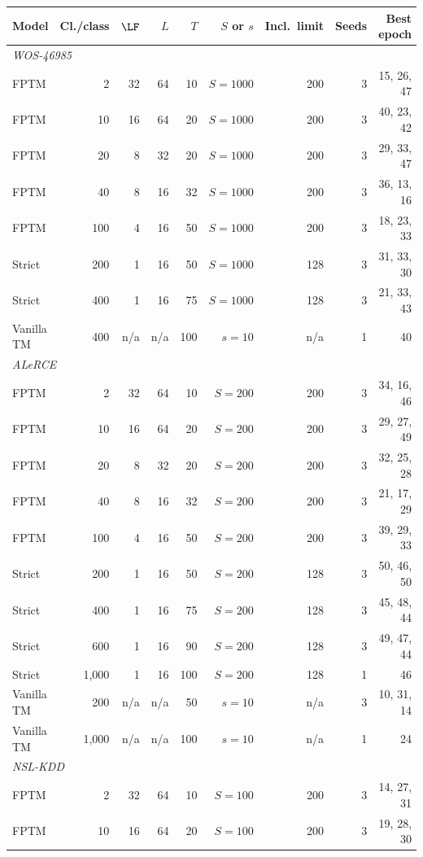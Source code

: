 \begin{tabular}{lrrrrrrrr}
\toprule
Model & Cl./class & $\LF$ & $L$ & $T$ & $S$ or $s$ & Incl.\ limit & Seeds & Best epoch \\
\midrule
\multicolumn{9}{l}{\textit{WOS-46985}} \\
FPTM & 2 & 32 & 64 & 10 & $S=1000$ & 200 & 3 & 15, 26, 47 \\
FPTM & 10 & 16 & 64 & 20 & $S=1000$ & 200 & 3 & 40, 23, 42 \\
FPTM & 20 & 8 & 32 & 20 & $S=1000$ & 200 & 3 & 29, 33, 47 \\
FPTM & 40 & 8 & 16 & 32 & $S=1000$ & 200 & 3 & 36, 13, 16 \\
FPTM & 100 & 4 & 16 & 50 & $S=1000$ & 200 & 3 & 18, 23, 33 \\
Strict & 200 & 1 & 16 & 50 & $S=1000$ & 128 & 3 & 31, 33, 30 \\
Strict & 400 & 1 & 16 & 75 & $S=1000$ & 128 & 3 & 21, 33, 43 \\
Vanilla TM & 400 & n/a & n/a & 100 & $s=10$ & n/a & 1 & 40 \\
\midrule
\multicolumn{9}{l}{\textit{ALeRCE}} \\
FPTM & 2 & 32 & 64 & 10 & $S=200$ & 200 & 3 & 34, 16, 46 \\
FPTM & 10 & 16 & 64 & 20 & $S=200$ & 200 & 3 & 29, 27, 49 \\
FPTM & 20 & 8 & 32 & 20 & $S=200$ & 200 & 3 & 32, 25, 28 \\
FPTM & 40 & 8 & 16 & 32 & $S=200$ & 200 & 3 & 21, 17, 29 \\
FPTM & 100 & 4 & 16 & 50 & $S=200$ & 200 & 3 & 39, 29, 33 \\
Strict & 200 & 1 & 16 & 50 & $S=200$ & 128 & 3 & 50, 46, 50 \\
Strict & 400 & 1 & 16 & 75 & $S=200$ & 128 & 3 & 45, 48, 44 \\
Strict & 600 & 1 & 16 & 90 & $S=200$ & 128 & 3 & 49, 47, 44 \\
Strict & 1,000 & 1 & 16 & 100 & $S=200$ & 128 & 1 & 46 \\
Vanilla TM & 200 & n/a & n/a & 50 & $s=10$ & n/a & 3 & 10, 31, 14 \\
Vanilla TM & 1,000 & n/a & n/a & 100 & $s=10$ & n/a & 1 & 24 \\
\midrule
\multicolumn{9}{l}{\textit{NSL-KDD}} \\
FPTM & 2 & 32 & 64 & 10 & $S=100$ & 200 & 3 & 14, 27, 31 \\
FPTM & 10 & 16 & 64 & 20 & $S=100$ & 200 & 3 & 19, 28, 30 \\

\end{tabular}
